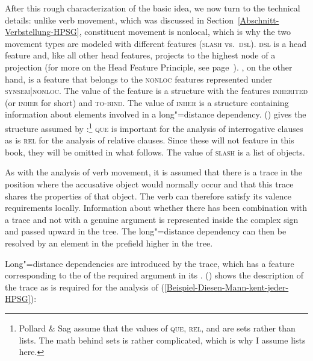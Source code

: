 After this rough characterization of the basic idea, we now turn to the technical details: unlike verb
movement, which was discussed in Section~\ref{Abschnitt-Verbstellung-HPSG}, constituent movement is
nonlocal, which is why the two movement types are modeled with different features (\textsc{slash} vs.\ \textsc{dsl}).
\textsc{dsl} is a head feature and, like all other head features, projects to the highest node of a projection (for more on the Head Feature Principle,
see page~\pageref{prinzip-hfp}). \slasch, on the other hand, is a feature that belongs to the \textsc{nonloc} features represented under \textsc{synsem|nonloc}. The value of the \nonloc feature is a structure with the features \textsc{inherited} (or \textsc{inher} for short) and 
\textsc{to-bind}. The value of \textsc{inher} is a structure containing information about elements involved in a long"=distance dependency.
() gives the structure assumed by \citet[]{ps2}:\footnote{%
  Pollard \& Sag assume that the values of \textsc{que}, \textsc{rel}, and \slasch are sets rather
  than lists. The math behind sets is rather complicated, which is why I assume lists here.
}
\ea
{}
\z
\textsc{que} is important for the analysis of interrogative clauses as is \textsc{rel} for the analysis of relative
clauses. Since these will not feature in this book, they will be omitted in what follows. The value of \textsc{slash}
is a list of  objects.

As with the analysis of verb movement, it is assumed that there is a
trace in the position where the accusative object would normally occur and that this trace shares the properties of that object. The verb can therefore satisfy its valence requirements locally. Information about whether
there has been combination with a trace and not with a genuine argument is represented inside the complex sign and passed upward in the tree.
The long"=distance dependency can then be resolved by an element in the prefield higher in the tree.

Long"=distance dependencies are introduced by the trace, which has a feature corresponding to the \localv of the required argument in its \slashl.
() shows the description of the trace as is required for the analysis of (\ref{Beispiel-Diesen-Mann-kent-jeder-HPSG}):

